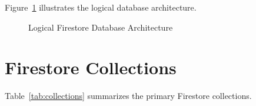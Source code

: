 Figure~\ref{fig:firestore_architecture} illustrates the logical
database architecture.

\begin{figure}[H]
\centering


\caption{Logical Firestore Database Architecture}

\label{fig:firestore_architecture}

\end{figure}

\section{Firestore Collections}
\label{sec:firestore-collections}

Table~\ref{tab:collections} summarizes the primary Firestore
collections.

